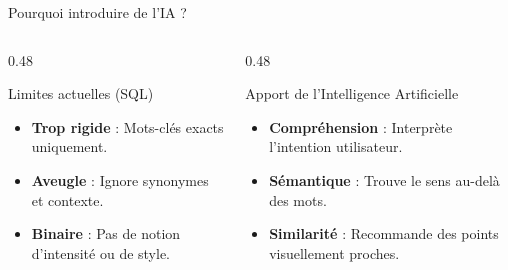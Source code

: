 \documentclass[aspectratio=169, 11pt]{beamer}
\begin{document}
\begin{frame}{Pourquoi introduire de l'IA ?}
    \begin{columns}[T, onlytextwidth]
        \begin{column}{0.48\textwidth}
            \begin{block}{Limites actuelles (SQL)}
                \begin{itemize}
                    \setlength\itemsep{1em}
                    \item \textbf{Trop rigide} : Mots-clés exacts uniquement.
                    \item \textbf{Aveugle} : Ignore synonymes et contexte.
                    \item \textbf{Binaire} : Pas de notion d'intensité ou de style.
                \end{itemize}
            \end{block}
        \end{column}
        \begin{column}{0.48\textwidth}
            \begin{block}{Apport de l'Intelligence Artificielle}
                \begin{itemize}
                    \setlength\itemsep{1em}
                    \item \textbf{Compréhension} : Interprète l'intention utilisateur.
                    \item \textbf{Sémantique} : Trouve le sens au-delà des mots.
                    \item \textbf{Similarité} : Recommande des points visuellement proches.
                \end{itemize}
            \end{block}
        \end{column}
    \end{columns}
\end{frame}
\end{document}
